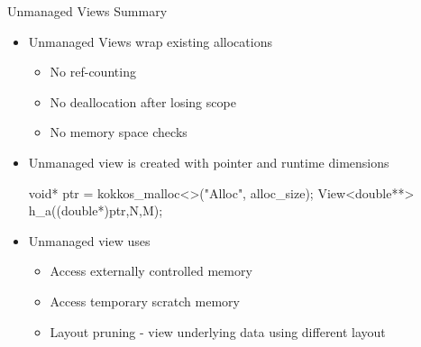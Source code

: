 
\begin{frame}[fragile]{Unmanaged Views Summary}

\vspace{-10pt}

  \begin{itemize}
    \item{Unmanaged Views wrap existing allocations} 
    \begin{itemize}
       \item{No ref-counting}
       \item{No deallocation after losing scope}
       \item{No memory space checks}
    \end{itemize}
    \pause
    \item{Unmanaged view is created with pointer and runtime dimensions }  
    \pause
  \begin{code}[keywords={}]
void* ptr = kokkos_malloc<>("Alloc", alloc_size);
View<double**> h_a((double*)ptr,N,M);
  \end{code}
  \pause
    \item {Unmanaged view uses}
    \begin{itemize}
    \item {Access externally controlled memory }
    \item {Access temporary scratch memory}
    \item {Layout pruning - view underlying data using different layout}
    \end{itemize} 
  \end{itemize}

\end{frame}
